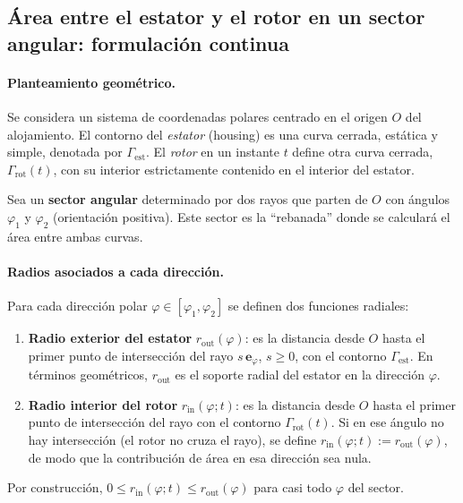 \documentclass{LS}
\begin{document}
\subsection{Área entre el estator y el rotor en un sector angular: formulación continua}

\paragraph{Planteamiento geométrico.}
Se considera un sistema de coordenadas polares centrado en el origen $O$ del alojamiento.
El contorno del \emph{estator} (housing) es una curva cerrada, estática y simple, denotada por $\Gamma_{\mathrm{est}}$.
El \emph{rotor} en un instante $t$ define otra curva cerrada, $\Gamma_{\mathrm{rot}}(t)$, con su interior estrictamente contenido en el interior del estator.

Sea un \textbf{sector angular} determinado por dos rayos que parten de $O$ con ángulos
$\varphi_1$ y $\varphi_2$ (orientación positiva). Este sector es la ``rebanada'' donde se calculará el área entre ambas curvas.

\paragraph{Radios asociados a cada dirección.}
Para cada dirección polar $\varphi\in[\varphi_1,\varphi_2]$ se definen dos funciones radiales:

\begin{enumerate}
  \item \textbf{Radio exterior del estator} $r_{\mathrm{out}}(\varphi)$:
  es la distancia desde $O$ hasta el primer punto de intersección del rayo
  $s\,\mathbf e_\varphi$, $s\ge 0$, con el contorno $\Gamma_{\mathrm{est}}$.
  En términos geométricos, $r_{\mathrm{out}}$ es el soporte radial del estator en la dirección $\varphi$.
  \item \textbf{Radio interior del rotor} $r_{\mathrm{in}}(\varphi;t)$:
  es la distancia desde $O$ hasta el primer punto de intersección del rayo
  con el contorno $\Gamma_{\mathrm{rot}}(t)$. Si en ese ángulo no hay intersección (el rotor no cruza el rayo),
  se define $r_{\mathrm{in}}(\varphi;t):=r_{\mathrm{out}}(\varphi)$, de modo que la contribución de área en esa dirección sea nula.
\end{enumerate}

Por construcción, $0\le r_{\mathrm{in}}(\varphi;t)\le r_{\mathrm{out}}(\varphi)$ para casi todo $\varphi$ del sector.
\end{document}

